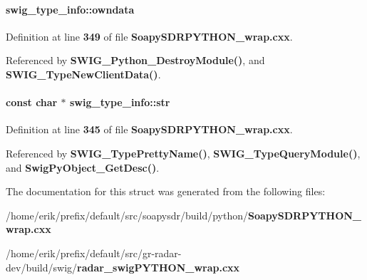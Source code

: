 \paragraph[{owndata}]{ swig\+\_\+type\+\_\+info\+::owndata}\label{structswig__type__info_a93c25d5903cbfcb82208eea7227c32bd}


Definition at line {\bf 349} of file {\bf Soapy\+S\+D\+R\+P\+Y\+T\+H\+O\+N\+\_\+wrap.\+cxx}.



Referenced by {\bf S\+W\+I\+G\+\_\+\+Python\+\_\+\+Destroy\+Module()}, and {\bf S\+W\+I\+G\+\_\+\+Type\+New\+Client\+Data()}.

\paragraph[{str}]{\setlength{\rightskip}{0pt plus 5cm}const char $\ast$ swig\+\_\+type\+\_\+info\+::str}\label{structswig__type__info_aaafd19f362ddc521d6a846ce41044471}


Definition at line {\bf 345} of file {\bf Soapy\+S\+D\+R\+P\+Y\+T\+H\+O\+N\+\_\+wrap.\+cxx}.



Referenced by {\bf S\+W\+I\+G\+\_\+\+Type\+Pretty\+Name()}, {\bf S\+W\+I\+G\+\_\+\+Type\+Query\+Module()}, and {\bf Swig\+Py\+Object\+\_\+\+Get\+Desc()}.



The documentation for this struct was generated from the following files\+:\begin{DoxyCompactItemize}
\item 
/home/erik/prefix/default/src/soapysdr/build/python/{\bf Soapy\+S\+D\+R\+P\+Y\+T\+H\+O\+N\+\_\+wrap.\+cxx}\item 
/home/erik/prefix/default/src/gr-\/radar-\/dev/build/swig/{\bf radar\+\_\+swig\+P\+Y\+T\+H\+O\+N\+\_\+wrap.\+cxx}\end{DoxyCompactItemize}

